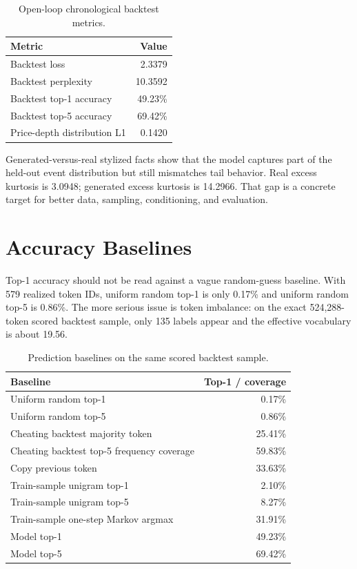 \documentclass[11pt]{article}
\begin{document}
\begin{table}[htbp]
  \centering
  \caption{Open-loop chronological backtest metrics.}
  \begin{tabular}{lr}
    \toprule
    Metric & Value \\
    \midrule
    Backtest loss & 2.3379 \\
    Backtest perplexity & 10.3592 \\
    Backtest top-1 accuracy & 49.23\% \\
    Backtest top-5 accuracy & 69.42\% \\
    Price-depth distribution L1 & 0.1420 \\
    \bottomrule
  \end{tabular}
\end{table}

Generated-versus-real stylized facts show that the model captures part of the
held-out event distribution but still mismatches tail behavior. Real excess
kurtosis is 3.0948; generated excess kurtosis is 14.2966. That gap is a concrete
target for better data, sampling, conditioning, and evaluation.

\section{Accuracy Baselines}

Top-1 accuracy should not be read against a vague random-guess baseline. With
579 realized token IDs, uniform random top-1 is only 0.17\% and uniform random
top-5 is 0.86\%. The more serious issue is token imbalance: on the exact
524,288-token scored backtest sample, only 135 labels appear and the effective
vocabulary is about 19.56.

\begin{table}[htbp]
  \centering
  \caption{Prediction baselines on the same scored backtest sample.}
  \begin{tabular}{lr}
    \toprule
    Baseline & Top-1 / coverage \\
    \midrule
    Uniform random top-1 & 0.17\% \\
    Uniform random top-5 & 0.86\% \\
    Cheating backtest majority token & 25.41\% \\
    Cheating backtest top-5 frequency coverage & 59.83\% \\
    Copy previous token & 33.63\% \\
    Train-sample unigram top-1 & 2.10\% \\
    Train-sample unigram top-5 & 8.27\% \\
    Train-sample one-step Markov argmax & 31.91\% \\
    Model top-1 & 49.23\% \\
    Model top-5 & 69.42\% \\
    \bottomrule
  \end{tabular}
\end{table}
\end{document}
